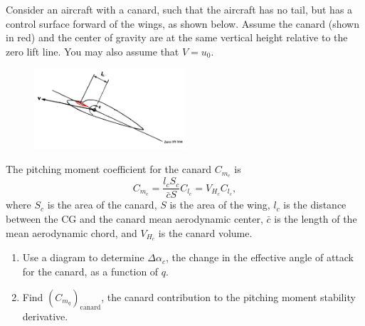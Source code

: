 \begin{question}
    Consider an aircraft with a canard, such that the aircraft has no tail, but has a control surface forward of the wings, as shown below. Assume the canard (shown in red) and the center of gravity are at the same vertical height relative to the zero lift line. You may also assume that $V=u_0$.

    \begin{figure}[h]
        \centering
        \includegraphics[width=0.5\textwidth]{questions/canard.png}
        \label{fig:canard}
    \end{figure}

    The pitching moment coefficient for the canard $C_{m_c}$ is
    \begin{equation*}
        C_{m_c} = \frac{l_cS_c}{\bar{c}S}C_{l_c}=V_{H_c}C_{l_c},
    \end{equation*}
    where $S_c$ is the area of the canard, $S$ is the area of the wing, $l_c$ is the distance between the CG and the canard mean aerodynamic center, $\bar{c}$ is the length of the mean aerodynamic chord, and $V_{H_c}$ is the canard volume.

\begin{enumerate}
    \item Use a diagram to determine $\Delta \alpha_c$, the change in the effective angle of attack for the canard, as a function of $q$.
    \item Find $(C_{m_q})_{\text{canard}}$, the canard contribution to the pitching moment stability derivative.
\end{enumerate}

\end{question}
